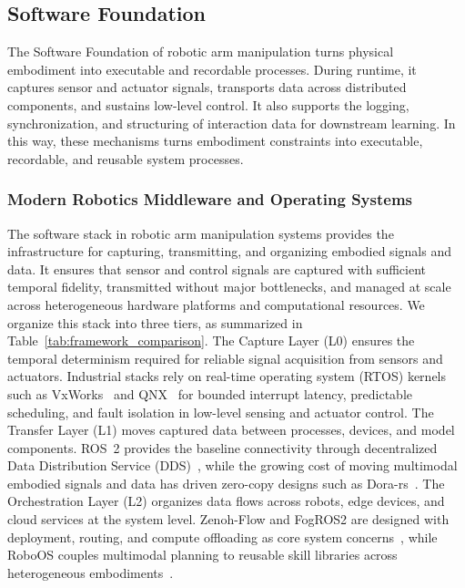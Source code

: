 \documentclass[acmsmall,screen,review]{acmart}
\begin{document}
\subsection{Software Foundation}\label{sec:embodiment_software}

The Software Foundation of robotic arm manipulation turns physical embodiment into executable and recordable processes.
During runtime, it captures sensor and actuator signals, transports data across distributed components, and sustains low-level control.
It also supports the logging, synchronization, and structuring of interaction data for downstream learning.
In this way, these mechanisms turns embodiment constraints into executable, recordable, and reusable system processes.

\subsubsection{Modern Robotics Middleware and Operating Systems}\label{subsec:control_middleware}

The software stack in robotic arm manipulation systems provides the infrastructure for capturing, transmitting, and organizing embodied signals and data. 
It ensures that sensor and control signals are captured with sufficient temporal fidelity, transmitted without major bottlenecks, and managed at scale across heterogeneous hardware platforms and computational resources.
We organize this stack into three tiers, as summarized in Table~\ref{tab:framework_comparison}. 
The Capture Layer (L0) ensures the temporal determinism required for reliable signal acquisition from sensors and actuators. 
Industrial stacks rely on real-time operating system (RTOS) kernels such as VxWorks~\cite{xu2014mpi} and QNX~\cite{dan1992architectural} for bounded interrupt latency, predictable scheduling, and fault isolation in low-level sensing and actuator control.
The Transfer Layer (L1) moves captured data between processes, devices, and model components. 
ROS~2 provides the baseline connectivity through decentralized Data Distribution Service (DDS)~\cite{macenski2022robot}, while the growing cost of moving multimodal embodied signals and data has driven zero-copy designs such as Dora-rs~\cite{zhang2026dora}.
The Orchestration Layer (L2) organizes data flows across robots, edge devices, and cloud services at the system level. 
Zenoh-Flow and FogROS2 are designed with deployment, routing, and compute offloading as core system concerns~\cite{baldoni2023zenohflow, ichnowski2022fogros2}, while RoboOS couples multimodal planning to reusable skill libraries across heterogeneous embodiments~\cite{wang2025roboos}.
\end{document}
